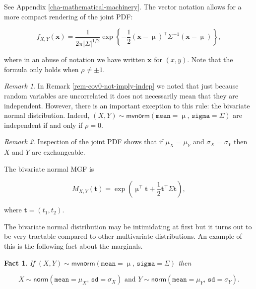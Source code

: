 \documentclass[]{book}
\numberwithin{equation}{chapter}
\numberwithin{figure}{chapter}
\theoremstyle{plain}
\newtheorem{fact}[thm]{Fact}
\theoremstyle{definition}
\theoremstyle{remark}
\theoremstyle{definition}
\theoremstyle{definition}
\theoremstyle{remark}
\newtheorem*{remark}{Remark}
\begin{document}
See Appendix \ref{cha-mathematical-machinery}. The vector notation
allows for a more compact rendering of the joint PDF:

\begin{equation}
f_{X,Y}(\mathbf{x})=\frac{1}{2\pi\left|\Sigma\right|^{1/2}}\exp\left\{ -\frac{1}{2}\left(\mathbf{x}-\upmu\right)^{\top}\Sigma^{-1}\left(\mathbf{x}-\upmu\right)\right\} ,
\end{equation}

where in an abuse of notation we have written \(\mathbf{x}\) for
\((x,y)\). Note that the formula only holds when \(\rho\neq\pm1\).

\bigskip

\begin{remark}
In Remark \ref{rem-cov0-not-imply-indep} we noted that just because
random variables are uncorrelated it does not necessarily mean that they
are independent. However, there is an important exception to this rule:
the bivariate normal distribution. Indeed,
\((X,Y)\sim\mathsf{mvnorm}(\mathtt{mean}=\upmu,\,\mathtt{sigma}=\Sigma)\)
are independent if and only if \(\rho=0\).
\end{remark}

\bigskip

\begin{remark}
Inspection of the joint PDF shows that if \(\mu_{X}=\mu_{Y}\) and
\(\sigma_{X}=\sigma_{Y}\) then \(X\) and \(Y\) are exchangeable.
\end{remark}

The bivariate normal MGF is

\begin{equation}
M_{X,Y}(\mathbf{t})=\exp\left(\upmu^{\top}\mathbf{t}+\frac{1}{2}\mathbf{t}^{\top}\Sigma\mathbf{t}\right),
\end{equation}

where \(\mathbf{t}=(t_{1},t_{2})\).

The bivariate normal distribution may be intimidating at first but it
turns out to be very tractable compared to other multivariate
distributions. An example of this is the following fact about the
marginals.

\bigskip

\begin{fact}
If
\((X,Y)\sim\mathsf{mvnorm}(\mathtt{mean}=\upmu,\,\mathtt{sigma}=\Sigma)\)
then

\begin{equation}
X\sim\mathsf{norm}(\mathtt{mean}=\mu_{X},\,\mathtt{sd}=\sigma_{X})\mbox{ and }Y\sim\mathsf{norm}(\mathtt{mean}=\mu_{Y},\,\mathtt{sd}=\sigma_{Y}).
\end{equation}
\end{fact}
\end{document}
